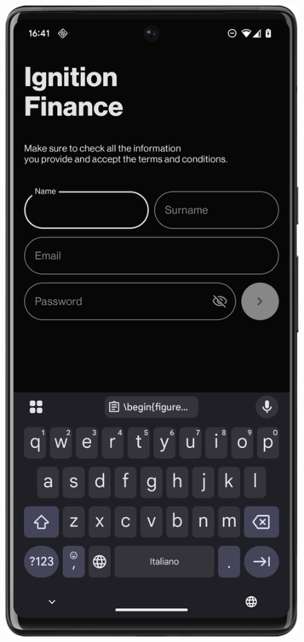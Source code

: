 \begin{figure}[H]
\begin{minipage}{0.24\textwidth}
        \label{fig:login}
    \end{minipage}
    \hfill
    \begin{minipage}{0.24\textwidth}
        \centering
        \includegraphics[width=\textwidth]{foto/signup}

\end{minipage}
\end{figure}
